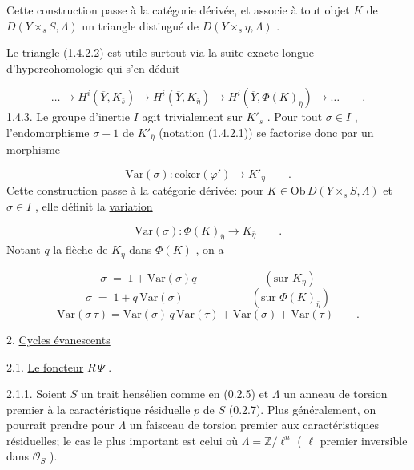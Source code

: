 
Cette construction passe à la catégorie dérivée, et associe à tout objet $K$ de $D(Y \times_s S, \Lambda)$ un triangle distingué de $D(Y \times_s \eta, \Lambda)$ .

Le triangle (1.4.2.2) est utile surtout via la suite exacte longue d'hypercohomologie qui s'en déduit

\begin{equation*}
\dots \longrightarrow H^i(\overline{Y}, K_{\bar{s}}) \longrightarrow H^i(\overline{Y}, K_{\bar{\eta}}) \longrightarrow H^i(\overline{Y}, \Phi(K)_{\bar{\eta}}) \longrightarrow \dots \qquad .
\end{equation*}
1.4.3. Le groupe d'inertie $I$ agit trivialement sur $K'_{\bar{s}}$ . Pour tout $\sigma \in I$ , l'endomorphisme $\sigma - 1$ de $K'_{\bar{\eta}}$ (notation (1.4.2.1)) se factorise donc par un morphisme

\begin{equation*}
\mathrm{Var}(\sigma) : \mathrm{coker}(\varphi') \longrightarrow K'_{\bar{\eta}} \qquad .
\end{equation*}
Cette construction passe à la catégorie dérivée: pour $K \in \mathrm{Ob}\, D(Y \times_s S, \Lambda)$ et $\sigma \in I$ , elle définit la \underline{variation}

\begin{equation}\tag{1.4.3.1}
\mathrm{Var}(\sigma) : \Phi(K)_{\bar{\eta}} \longrightarrow K_{\bar{\eta}} \qquad .
\end{equation}
Notant $q$ la flèche de $K_{\eta}$ dans $\Phi(K)$ , on a

\begin{equation}\tag{1.4.3.2}
\sigma \;=\; 1 + \mathrm{Var}(\sigma)q \qquad\qquad\qquad (\text{sur } K_{\bar{\eta}} )
\end{equation}
\begin{equation}\tag{1.4.3.3}
\sigma \;=\; 1 + q\, \mathrm{Var}(\sigma) \qquad\qquad\qquad (\text{sur } \Phi(K)_{\bar{\eta}} )
\end{equation}
\begin{equation}\tag{1.4.3.4}
\mathrm{Var}(\sigma\, \tau) = \mathrm{Var}(\sigma)\, q\, \mathrm{Var}(\tau) + \mathrm{Var}(\sigma) + \mathrm{Var}(\tau) \qquad .
\end{equation}

2. \underline{Cycles évanescents}


2.1. \underline{Le foncteur} $R\,\Psi$ .

2.1.1. Soient $S$ un trait hensélien comme en (0.2.5) et $\Lambda$ un anneau de torsion premier à la caractéristique résiduelle $p$ de $S$ (0.2.7). Plus généralement, on pourrait prendre pour $\Lambda$ un faisceau de torsion premier aux caractéristiques résiduelles; le cas le plus important est celui où $\Lambda = \mathbb{Z}/\ell^{n}$ ( $\ell$ premier inversible dans $\mathcal{O}_{S}$ ).


